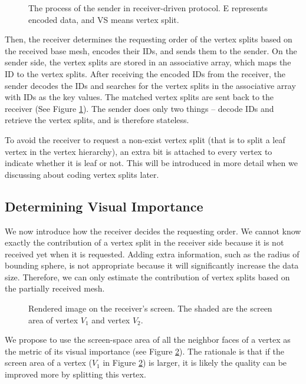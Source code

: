      \begin{figure}
     \centering
     \caption{The process of the sender in receiver-driven protocol. 
     E represents encoded data, and VS means vertex split. \label{dstream:process}}
     \end{figure}
     Then, the receiver determines
     the requesting order of the vertex splits based on the received base mesh, 
     encodes their IDs, and
     sends them to the sender. On the sender side, the vertex splits are stored
     in an associative array, which maps the ID to the vertex splits. 
     After receiving the encoded IDs from the receiver, 
     the sender decodes the IDs and searches for the vertex splits 
     in the associative array
     with IDs as the key values. The matched vertex splits
     are sent back to the receiver (See Figure \ref{dstream:process}). 
     The sender does only two things -- decode IDs and retrieve the 
     vertex splits, and is therefore stateless. 

     To avoid the receiver to request a non-exist vertex split (that is to split
     a leaf vertex in the vertex hierarchy),
     an extra bit is attached to every vertex to indicate whether it is leaf or not.
     This will be introduced in more detail when we discussing about coding vertex splits
     later.
     
     \subsection{Determining Visual Importance}
     \label{ss:dstream:visual}
     We now introduce how the receiver decides the requesting order. 
     We cannot know exactly the contribution of a vertex split in the receiver side
     because it is not received yet when it is requested.
     Adding extra information, such as the radius of bounding sphere, is not appropriate
     because it will significantly increase the data size. 
     Therefore, we can only estimate the contribution of vertex splits based on the 
     partially received mesh.
     
    \begin{figure}
    \centering
    \caption{Rendered image on the receiver's screen. 
    The shaded are the screen area of vertex $V_1$ and vertex $V_2$.
    \label{dstream:screen_area}}
    \end{figure}
     We propose to use the screen-space area of all the neighbor faces of a vertex as the 
     metric of its visual importance (see Figure \ref{dstream:screen_area}).
     The rationale is that if the screen area of a vertex ($V_1$ in Figure \ref{dstream:screen_area}) 
    is larger, it is likely the quality can be improved more by splitting this vertex. 
    
